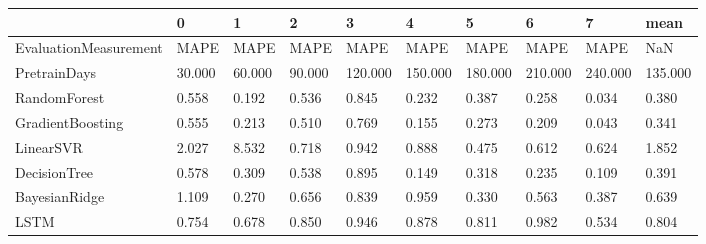\begin{tabular}{llllllllll}
\toprule
{} &      0 &      1 &      2 &       3 &       4 &       5 &       6 &       7 &    mean \\
\midrule
EvaluationMeasurement &   MAPE &   MAPE &   MAPE &    MAPE &    MAPE &    MAPE &    MAPE &    MAPE &     NaN \\
PretrainDays          & 30.000 & 60.000 & 90.000 & 120.000 & 150.000 & 180.000 & 210.000 & 240.000 & 135.000 \\
RandomForest          &  0.558 &  0.192 &  0.536 &   0.845 &   0.232 &   0.387 &   0.258 &   0.034 &   0.380 \\
GradientBoosting      &  0.555 &  0.213 &  0.510 &   0.769 &   0.155 &   0.273 &   0.209 &   0.043 &   0.341 \\
LinearSVR             &  2.027 &  8.532 &  0.718 &   0.942 &   0.888 &   0.475 &   0.612 &   0.624 &   1.852 \\
DecisionTree          &  0.578 &  0.309 &  0.538 &   0.895 &   0.149 &   0.318 &   0.235 &   0.109 &   0.391 \\
BayesianRidge         &  1.109 &  0.270 &  0.656 &   0.839 &   0.959 &   0.330 &   0.563 &   0.387 &   0.639 \\
LSTM                  &  0.754 &  0.678 &  0.850 &   0.946 &   0.878 &   0.811 &   0.982 &   0.534 &   0.804 \\
\bottomrule
\end{tabular}

